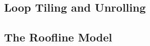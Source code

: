 \subsection{Loop Tiling and Unrolling}
\label{sec:tiling}

\subsection{The Roofline Model}
\label{sec:roofline}
